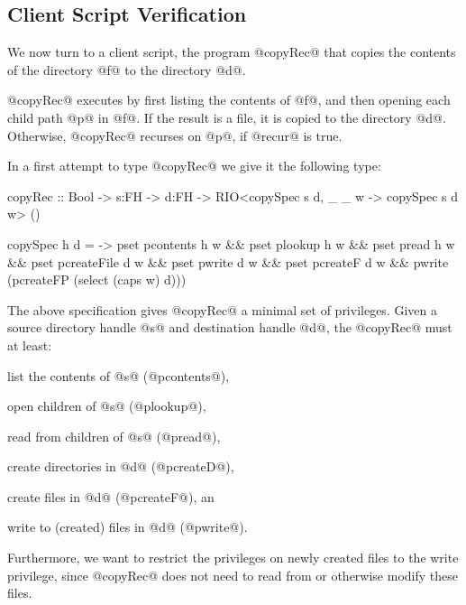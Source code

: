 \subsection{Client Script Verification}
\label{sec:fs-client}
%
We now turn to a client script,
the program @copyRec@ %
that copies the contents of the directory @f@ to the
directory @d@.
%
%
@copyRec@ executes by first listing the contents of @f@, 
and then opening each child path @p@ in @f@. 
%
If the result is a file, it is copied to the directory @d@.
%
Otherwise, @copyRec@ recurses on @p@, if @recur@ is true.

In a first attempt to type @copyRec@ we give it the following type:
\begin{code}
  copyRec :: Bool -> s:FH -> d:FH ->
             RIO<copySpec s d, \_ _ w -> copySpec s d w> () 

  copySpec h d = \w ->
   pset pcontents h w && pset plookup h     w &&
   pset pread h     w && pset pcreateFile d w &&
   pset pwrite d    w && pset pcreateF d    w &&
   pwrite (pcreateFP (select (caps w) d)))
\end{code}              
%
The above specification gives @copyRec@ a minimal set of privileges. 
%
Given a source directory handle @s@ and destination handle @d@, the
@copyRec@ must at least:
%
\begin{inparaenum}[(1)]
  \item list the contents of @s@ (@pcontents@),
  \item open children of @s@ (@plookup@),
  \item read from children of @s@ (@pread@),
  \item create directories in @d@ (@pcreateD@),
  \item create files in @d@ (@pcreateF@), an
  \item write to (created) files in @d@ (@pwrite@).
\end{inparaenum}
%
Furthermore, we want to restrict the privileges on newly created files
to the write privilege, since @copyRec@ does not need to read from or
otherwise modify these files.

